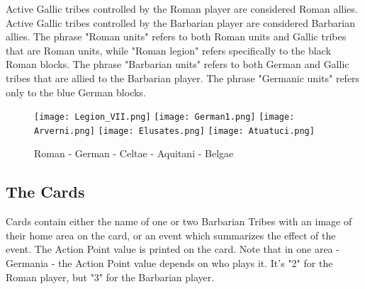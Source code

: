 Active Gallic tribes controlled by the Roman player are considered Roman allies. Active Gallic tribes controlled by the Barbarian player are considered Barbarian allies. The phrase "Roman units" refers to both Roman units and Gallic tribes that are Roman units, while "Roman legion" refers specifically to the black Roman blocks. The phrase "Barbarian units" refers to both German and Gallic tribes that are allied to the Barbarian player. The phrase "Germanic units" refers only to the blue German blocks.

\begin{figure}[h]
  \centering
  \texttt{[image: Legion\_VII.png]}
  \texttt{[image: German1.png]}
  \texttt{[image: Arverni.png]}
  \texttt{[image: Elusates.png]}
  \texttt{[image: Atuatuci.png]}
  \caption*{Roman - German - Celtae - Aquitani - Belgae}
\end{figure}

\par
\subsection{The Cards}
Cards contain either the name of one or two Barbarian Tribes with an image of their home area on the card, or an event which summarizes the effect of the event. The Action Point value is printed on the card. Note that in one area - Germania - the Action Point value depends on who plays it. It's "2" for the Roman player, but "3" for the Barbarian player.
